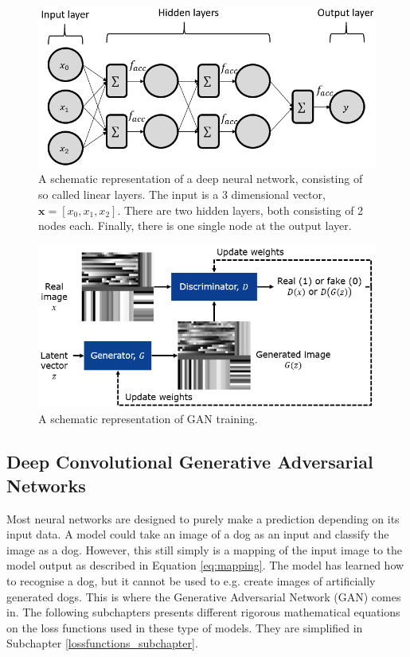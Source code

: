 \begin{figure} [!htb]
    \centering
    \includegraphics[scale=0.5]{figuren/fig2.2.1.2.png}
    \caption{A schematic representation of a deep neural network, consisting of so called linear layers. The input is a 3 dimensional vector, $\boldsymbol{x}=[x_0, x_1, x_2]$. There are two hidden layers, both consisting of 2 nodes each. Finally, there is one single node at the output layer.}
    \label{fig:deepdnn}
\end{figure}

\begin{figure} [!htb]
    \centering
    \includegraphics[scale=0.5]{figuren/fig3.png}
    \caption{A schematic representation of GAN training.}
    \label{fig:gantraining}
\end{figure}






\subsection{Deep Convolutional Generative Adversarial Networks}
Most neural networks are designed to purely make a prediction depending on its input data. A model could take an image of a dog as an input and classify the image as a dog. However, this still simply is a mapping of the input image to the model output as described in Equation \ref{eq:mapping}. The model has learned how to recognise a dog, but it cannot be used to e.g. create images of artificially generated dogs. This is where the Generative Adversarial Network (GAN) comes in. The following subchapters presents different rigorous mathematical equations on the loss functions used in these type of models. They are simplified in Subchapter \ref{lossfunctions_subchapter}.

